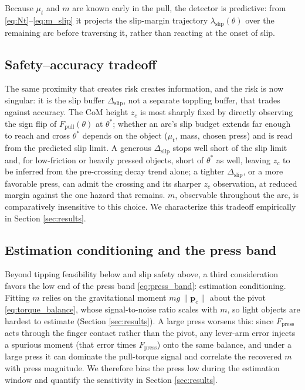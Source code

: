 \documentclass[10pt, conference]{IEEEtran}
\begin{document}
Because $\mu_t$ and $m$ are known early in the pull, the detector is predictive: from \eqref{eq:Nt}--\eqref{eq:m_slip} it projects the slip-margin trajectory $\lambda_{\mathrm{slip}}(\theta)$ over the remaining arc before traversing it, rather than reacting at the onset of slip.

\subsection{Safety--accuracy tradeoff}

The same proximity that creates risk creates information, and the risk is now singular: it is the slip buffer $\Delta_{\mathrm{slip}}$, not a separate toppling buffer, that trades against accuracy. The CoM height $z_c$ is most sharply fixed by directly observing the sign flip of $F_{\mathrm{pull}}(\theta)$ at $\theta^{*}$; whether an arc's slip budget extends far enough to reach and cross $\theta^{*}$ depends on the object ($\mu_t$, mass, chosen press) and is read from the predicted slip limit. A generous $\Delta_{\mathrm{slip}}$ stops well short of the slip limit and, for low-friction or heavily pressed objects, short of $\theta^{*}$ as well, leaving $z_c$ to be inferred from the pre-crossing decay trend alone; a tighter $\Delta_{\mathrm{slip}}$, or a more favorable press, can admit the crossing and its sharper $z_c$ observation, at reduced margin against the one hazard that remains. $m$, observable throughout the arc, is comparatively insensitive to this choice. We characterize this tradeoff empirically in Section \ref{sec:results}.

\subsection{Estimation conditioning and the press band} \label{sec:conditioning}

Beyond tipping feasibility below and slip safety above, a third consideration favors the low end of the press band \eqref{eq:press_band}: estimation conditioning. Fitting $m$ relies on the gravitational moment $mg\,\lVert\mathbf{p}_c\rVert$ about the pivot \eqref{eq:torque_balance}, whose signal-to-noise ratio scales with $m$, so light objects are hardest to estimate (Section \ref{sec:results}). A large press worsens this: since $F_{\mathrm{press}}$ acts through the finger contact rather than the pivot, any lever-arm error injects a spurious moment (that error times $F_{\mathrm{press}}$) onto the same balance, and under a large press it can dominate the pull-torque signal and correlate the recovered $m$ with press magnitude. We therefore bias the press low during the estimation window and quantify the sensitivity in Section \ref{sec:results}.
\end{document}
